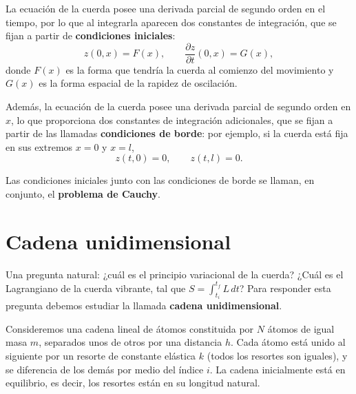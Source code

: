 La ecuación de la cuerda posee una derivada parcial de segundo orden en
el tiempo, por lo que al integrarla aparecen dos constantes de
integración, que se fijan a partir de \textbf{condiciones iniciales}:
\[
z(0,x) = F(x), \qquad \frac{\partial z}{\partial t}(0,x) = G(x),
\]
donde $F(x)$ es la forma que tendría la cuerda al comienzo del
movimiento y $G(x)$ es la forma espacial de la rapidez de oscilación.

Además, la ecuación de la cuerda posee una derivada parcial de segundo
orden en $x$, lo que proporciona dos constantes de integración
adicionales, que se fijan a partir de las llamadas \textbf{condiciones
de borde}: por ejemplo, si la cuerda está fija en sus extremos $x=0$ y
$x=l$,
\[
z(t,0) = 0, \qquad z(t,l) = 0.
\]

\begin{definicion}
Las condiciones iniciales junto con las condiciones de borde se llaman,
en conjunto, el \textbf{problema de Cauchy}.
\end{definicion}

\section{Cadena unidimensional}

Una pregunta natural: ¿cuál es el principio variacional de la cuerda?
¿Cuál es el Lagrangiano de la cuerda vibrante, tal que $S=\int_{t_i}^{t_f}
L\,dt$? Para responder esta pregunta debemos estudiar la llamada
\textbf{cadena unidimensional}.

Consideremos una cadena lineal de átomos constituida por $N$ átomos de
igual masa $m$, separados unos de otros por una distancia $h$. Cada
átomo está unido al siguiente por un resorte de constante elástica $k$
(todos los resortes son iguales), y se diferencia de los demás por medio
del índice $i$. La cadena inicialmente está en equilibrio, es decir, los
resortes están en su longitud natural.

\begin{center}
\end{center}


